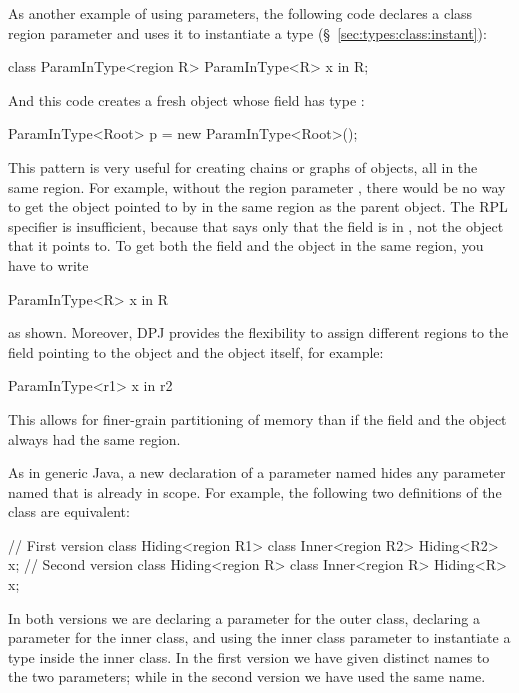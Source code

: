 As another example of using parameters, the following code declares a
class region parameter  and uses it to instantiate a type
(\S~\ref{sec:types:class:instant}):
%
\begin{dpjlisting}
class ParamInType<region R> {
  ParamInType<R> x in R;
}
\end{dpjlisting}
%
And this code creates a fresh  object whose field
 has type :
%
\begin{dpjlisting}
ParamInType<Root> p = new ParamInType<Root>();
\end{dpjlisting}
%
This pattern is very useful for creating chains or graphs of objects,
all in the same region.  For example, without the region parameter
, there would be no way to get the object pointed to by 
in the same region as the parent object.  The RPL specifier  is insufficient, because that says only that the field  is
in , not the object that it points to.  To get both the field
and the object in the same region, you have to write
%
\begin{dpjlisting}
ParamInType<R> x in R
\end{dpjlisting}
%
as shown.  Moreover, DPJ provides the flexibility to assign different
regions to the field pointing to the object and the object itself, for
example:
%
\begin{dpjlisting}
ParamInType<r1> x in r2
\end{dpjlisting}
%
This allows for finer-grain partitioning of memory than if the field
and the object always had the same region.

%
As in generic Java, a new declaration of a parameter named 
hides any parameter named  that is already in scope.  For
example, the following two definitions of the class  are
equivalent:
%
\begin{dpjlisting}
// First version
class Hiding<region R1> {
  class Inner<region R2> {
    Hiding<R2> x;
  }
}
// Second version
class Hiding<region R> {
  class Inner<region R> {
    Hiding<R> x;
  }
}
\end{dpjlisting}
%
In both versions we are declaring a parameter for the outer class,
declaring a parameter for the inner class, and using the inner class
parameter to instantiate a type inside the inner class.  In the first
version we have given distinct names to the two parameters; while in
the second version we have used the same name.

